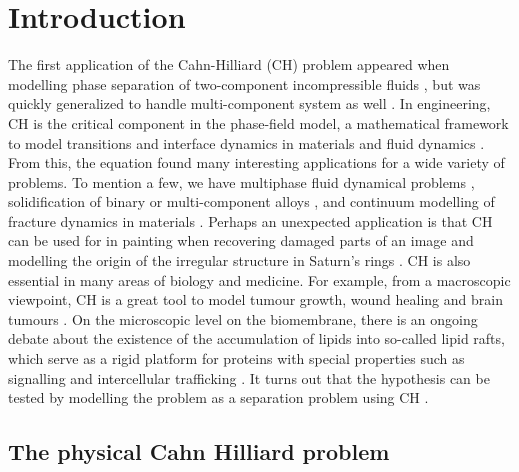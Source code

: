 \newpage
\section{Introduction}\label{sec:introduction}


The first application of the Cahn-Hilliard (CH) problem appeared when modelling phase separation of two-component incompressible fluids \cite{cahn1958free, cahn1959free, cahn1961spinodal}, but was quickly generalized to handle multi-component system
as well \cite{bosch2015fractional, eyre1993systems, toth2016phase, miranville2017cahn}. In engineering, CH is the critical component in
the phase-field model, a mathematical framework to model transitions and interface dynamics in materials and fluid dynamics \cite{steinbach2009phase, chen2002phase}.
From this, the equation found many interesting applications for a wide variety of problems. To mention a few, we have
multiphase fluid dynamical problems \cite{badalassi2003computation, li2016lattice, kim2012phase, shen2010phase}, solidification of binary or multi-component alloys \cite{kim1999phase, echebarria2004quantitative}, and continuum modelling of fracture dynamics in
materials \cite{kuhn2010continuum, li2015phase}. Perhaps an unexpected application is that CH can be used for in painting when recovering damaged parts of an image \cite{bertozzi2006inpainting, burger2009cahn, bosch2015fractional, brkic2020image}
and modelling the origin of the irregular structure in Saturn's rings \cite{tremaine2003origin}.
CH is also essential in many areas of biology and medicine. For example, from a macroscopic viewpoint, CH is a great tool to model tumour growth, wound healing and brain tumours \cite{agosti2017cahn, cristini2009nonlinear}.
On the microscopic level on the biomembrane, there is an ongoing debate about the existence of the accumulation of lipids into so-called lipid rafts, which serve as a rigid platform for proteins with
special properties such as signalling and intercellular trafficking \cite{ levental2020lipid, hancock2006lipid, munro2003lipid, simons1997functional}. It turns out that the hypothesis can be tested by modelling the problem as a separation problem using
CH \cite{miller2020divide, garcke2016coupled, yushutin2019computational}.

\subsection{The physical Cahn Hilliard problem}%
\label{sub:the_equations}

